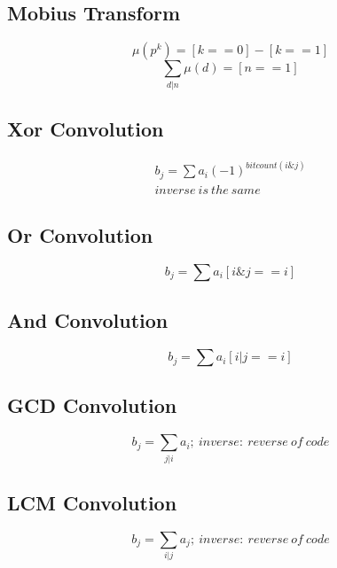 \documentclass[a4paper, twocolumn]{article}
\begin{document}
\subsection{Mobius Transform}
    \[\mu (p^k) = [k==0] - [k==1] \]
    \[\sum_{d|n}\mu (d) = [n==1] \]

\subsection{Xor Convolution}
    \begin{gather*}
        b_j = \sum a_i (-1)^{bitcount(i\&j)} \\
        inverse \ is \ the \ same
    \end{gather*}

\subsection{Or Convolution}
    \[ b_j = \sum a_i [i\&j == i] \]

\subsection{And Convolution}
    \[ b_j = \sum a_i [i|j == i] \]

\subsection{GCD Convolution}
    \[ b_j = \sum_{j|i} a_i ; \ inverse: \ reverse \ of \ code \]

\subsection{LCM Convolution}
    \[ b_j = \sum_{i|j} a_j ; \ inverse: \ reverse \ of \ code \]
\end{document}
